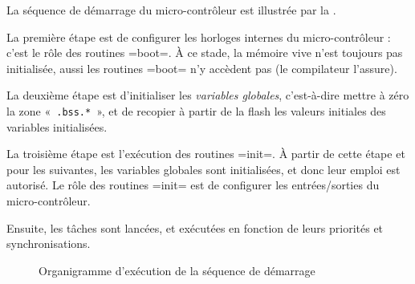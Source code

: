 



La séquence de démarrage du micro-contrôleur est illustrée par la .

La première étape est de configurer les horloges internes du micro-contrôleur : c'est le rôle des routines \plm=boot=. À ce stade, la mémoire vive n'est toujours pas initialisée, aussi les routines \plm=boot= n'y accèdent pas (le compilateur l'assure).

La deuxième étape est d'initialiser les \emph{variables globales}, c'est-à-dire mettre à zéro la zone «~\texttt{.bss.*}~», et de recopier à partir de la flash les valeurs initiales des variables initialisées.

La troisième étape est l'exécution des routines \plm=init=. À partir de cette étape et pour les suivantes, les variables globales sont initialisées, et donc leur emploi est autorisé. Le rôle des routines \plm=init= est de configurer les entrées/sorties du micro-contrôleur.

Ensuite, les tâches sont lancées, et exécutées en fonction de leurs priorités et synchronisations.

\begin{figure}[htbp]
  \centering
  \small
  \caption{Organigramme d'exécution de la séquence de démarrage}
\end{figure}


